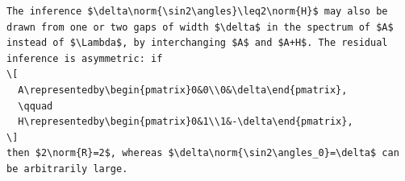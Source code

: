 \begin{verbatim}
The inference $\delta\norm{\sin2\angles}\leq2\norm{H}$ may also be drawn from one or two gaps of width $\delta$ in the spectrum of $A$ instead of $\Lambda$, by interchanging $A$ and $A+H$. The residual inference is asymmetric: if
\[
  A\representedby\begin{pmatrix}0&0\\0&\delta\end{pmatrix},
  \qquad
  H\representedby\begin{pmatrix}0&1\\1&-\delta\end{pmatrix},
\]
then $2\norm{R}=2$, whereas $\delta\norm{\sin2\angles_0}=\delta$ can be arbitrarily large.
\end{verbatim}

